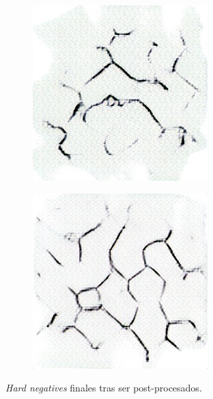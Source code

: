 \begin{figure}[H]
    \bigskip

    \begin{subfigure}{.28\textwidth}
        \centering
        \includegraphics[width=1\linewidth]{imagenes/image_generation/clean_results/perlin_e80_a1_f2_13.jpg}
    \end{subfigure}%
    \begin{subfigure}{.28\textwidth}
        \centering
        \includegraphics[width=1\linewidth]{imagenes/image_generation/clean_results/perlin_e85_a7_f2_42.jpg}
    \end{subfigure}

    \caption{\textit{Hard negatives} finales tras ser post-procesados.}
\end{figure}

